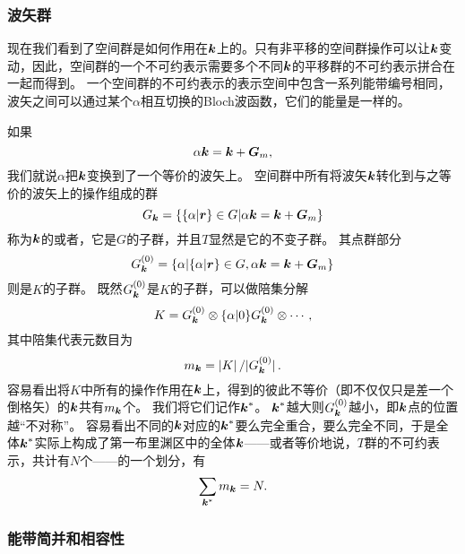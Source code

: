 \subsubsection{波矢群}\label{sec:wave-vector-group}

现在我们看到了空间群是如何作用在$\vb*{k}$上的。只有非平移的空间群操作可以让$\vb*{k}$变动，因此，空间群的一个不可约表示需要多个不同$\vb*{k}$的平移群的不可约表示拼合在一起而得到。
一个空间群的不可约表示的表示空间中包含一系列能带编号相同，波矢之间可以通过某个$\alpha$相互切换的Bloch波函数，它们的能量是一样的。

如果
\begin{equation}
    \alpha \vb*{k} = \vb*{k} + \vb*{G}_m,
\end{equation}
我们就说$\alpha$把$\vb*{k}$变换到了一个等价的波矢上。
空间群中所有将波矢$\vb*{k}$转化到与之等价的波矢上的操作组成的群
\begin{equation}
    G_{\vb*{k}} = \{ \{\alpha | \vb*{r}\} \in G | \alpha \vb*{k} = \vb*{k} + \vb*{G}_m \}
\end{equation}
称为$\vb*{k}$的或者，它是$G$的子群，并且$T$显然是它的不变子群。
其点群部分
\begin{equation}
    G_{\vb*{k}}^{(0)} = \{ \alpha | \{\alpha | \vb*{r}\} \in G,  \alpha \vb*{k} = \vb*{k} + \vb*{G}_m \}
\end{equation}
则是$K$的子群。
既然$G_{\vb*{k}}^{(0)}$是$K$的子群，可以做陪集分解
\begin{equation}
    K = G_{\vb*{k}}^{(0)} \otimes \{\alpha | 0\} G_{\vb*{k}}^{(0)} \otimes \cdots,
    \label{eq:k-point-group-gk-decomposition}
\end{equation}
其中陪集代表元数目为
\begin{equation}
    m_{\vb*{k}} = \abs*{K} / \abs*{G_{\vb*{k}}^{(0)}}.
\end{equation}
容易看出将$K$中所有的操作作用在$\vb*{k}$上，得到的彼此不等价（即不仅仅只是差一个倒格矢）的$\vb*{k}$共有$m_{\vb*{k}}$个。
我们将它们记作$\vb*{k}^*$。
$\vb*{k}^*$越大则$G^{(0)}_{\vb*{k}}$越小，即$\vb*{k}$点的位置越“不对称”。
容易看出不同的$\vb*{k}$对应的$\vb*{k}^*$要么完全重合，要么完全不同，于是全体$\vb*{k}^*$实际上构成了第一布里渊区中的全体$\vb*{k}$——或者等价地说，$T$群的不可约表示，共计有$N$个——的一个划分，有
\begin{equation}
    \sum_{\vb*{k}^*} m_{\vb*{k}} = N.
\end{equation}

\subsubsection{能带简并和相容性}

